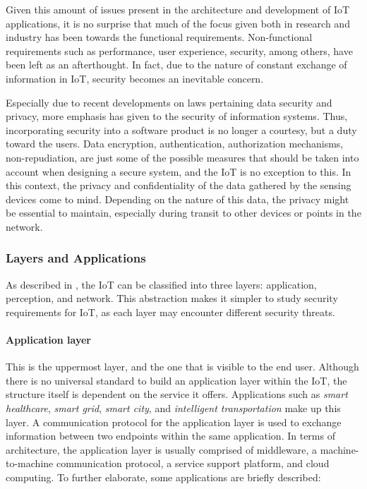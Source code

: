 \documentclass[12pt]{article}
\newcommand{\TODO}{\todo[inline]}
\begin{document}
Given this amount of issues present in the architecture and development of IoT applications, it is no surprise that much of the focus given both in research and industry has been towards the functional requirements. Non-functional requirements such as performance, user experience, security, among others, have been left as an afterthought. In fact, due to the nature of constant exchange of information in IoT, security becomes an inevitable concern.

\TODO{look for reference on law about privacy}
Especially due to recent developments on laws pertaining data security and privacy, more emphasis has given to the security of information systems. Thus, incorporating security into a software product is no longer a courtesy, but a duty toward the users. Data encryption, authentication, authorization mechanisms, non-repudiation, are just some of the possible measures that should be taken into account when designing a secure system, and the IoT is no exception to this. In this context, the privacy and confidentiality of the data gathered by the sensing devices come to mind. Depending on the nature of this data, the privacy might be essential to maintain, especially during transit to other devices or points in the network.

\subsubsection{Layers and Applications}
As described in \cite{ALABA201710}, the IoT can be classified into three layers: application, perception, and network. This abstraction makes it simpler to study security requirements for IoT, as each layer may encounter different security threats. 

\paragraph{Application layer} This is the uppermost layer, and the one that is visible to the end user. Although there is no universal standard to build an application layer within the IoT, the structure itself is dependent on the service it offers. Applications such as \emph{smart healthcare}, \emph{smart grid}, \emph{smart city}, and \emph{intelligent transportation} make up this layer. A communication protocol for the application layer is used to exchange information between two endpoints within the same application. In terms of architecture, the application layer is usually comprised of middleware, a machine-to-machine communication protocol, a service support platform, and cloud computing. To further elaborate, some applications are briefly described:
\end{document}
